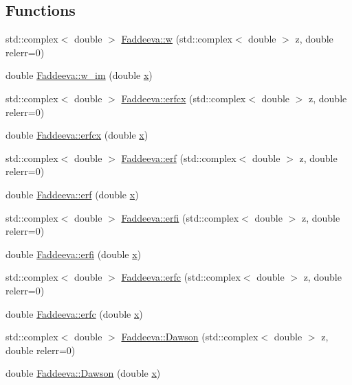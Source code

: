 \subsection*{Functions}
\begin{DoxyCompactItemize}
\item 
std\+::complex$<$ double $>$ \hyperlink{namespaceFaddeeva_a0e1f1f0d2dce77bfa0db22a63f8a42ff}{Faddeeva\+::w} (std\+::complex$<$ double $>$ z, double relerr=0)
\item 
double \hyperlink{namespaceFaddeeva_afb5630bc7c403b2109943f22913214b8}{Faddeeva\+::w\+\_\+im} (double \hyperlink{vecnorm1_8cc_ac73eed9e41ec09d58f112f06c2d6cb63}{x})
\item 
std\+::complex$<$ double $>$ \hyperlink{namespaceFaddeeva_a7e83cb6f67459df6c74aa2220f6fdb9b}{Faddeeva\+::erfcx} (std\+::complex$<$ double $>$ z, double relerr=0)
\item 
double \hyperlink{namespaceFaddeeva_af5360b5139cc6dc788209eb05d1baab8}{Faddeeva\+::erfcx} (double \hyperlink{vecnorm1_8cc_ac73eed9e41ec09d58f112f06c2d6cb63}{x})
\item 
std\+::complex$<$ double $>$ \hyperlink{namespaceFaddeeva_ae237ecbb8393d6c86d3b515d6677ffe8}{Faddeeva\+::erf} (std\+::complex$<$ double $>$ z, double relerr=0)
\item 
double \hyperlink{namespaceFaddeeva_ad8070b592bd46072441f110eaf9db93c}{Faddeeva\+::erf} (double \hyperlink{vecnorm1_8cc_ac73eed9e41ec09d58f112f06c2d6cb63}{x})
\item 
std\+::complex$<$ double $>$ \hyperlink{namespaceFaddeeva_ae01c2714310e91a2485c5861e58e81e5}{Faddeeva\+::erfi} (std\+::complex$<$ double $>$ z, double relerr=0)
\item 
double \hyperlink{namespaceFaddeeva_a4bf0feb821d8b14d0a7ee85e7fc35f3b}{Faddeeva\+::erfi} (double \hyperlink{vecnorm1_8cc_ac73eed9e41ec09d58f112f06c2d6cb63}{x})
\item 
std\+::complex$<$ double $>$ \hyperlink{namespaceFaddeeva_a415b553e96fc456a7e0354470d60ecdf}{Faddeeva\+::erfc} (std\+::complex$<$ double $>$ z, double relerr=0)
\item 
double \hyperlink{namespaceFaddeeva_aaf799931d13a75c6975d0b197e47f99f}{Faddeeva\+::erfc} (double \hyperlink{vecnorm1_8cc_ac73eed9e41ec09d58f112f06c2d6cb63}{x})
\item 
std\+::complex$<$ double $>$ \hyperlink{namespaceFaddeeva_ae5a704b7d95301280c9a834d3e0d59ad}{Faddeeva\+::\+Dawson} (std\+::complex$<$ double $>$ z, double relerr=0)
\item 
double \hyperlink{namespaceFaddeeva_a42faa33ef70a7509117dddb5a1c00e33}{Faddeeva\+::\+Dawson} (double \hyperlink{vecnorm1_8cc_ac73eed9e41ec09d58f112f06c2d6cb63}{x})
\end{DoxyCompactItemize}
